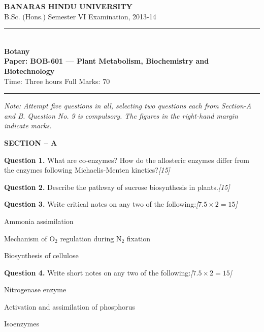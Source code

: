 \documentclass[11pt,a4paper]{article}
\newcommand{\pts}[1]{\hfill   \textit{[#1]}}
\begin{document}
\begin{center}
  {\large\bfseries BANARAS HINDU UNIVERSITY}\\[2pt]
  {\normalsize B.Sc. (Hons.) Semester VI Examination, 2013-14}\\[6pt]
  \rule{0.8\linewidth}{0.5pt}\\[6pt]
  {\large\bfseries Botany}\\[4pt]
  {\large\bfseries Paper: BOB-601 --- Plant Metabolism, Biochemistry and Biotechnology}\\[4pt]
  {\normalsize Time: Three hours \hfill Full Marks: 70}
\end{center}

\rule{\linewidth}{0.4pt}

\smallskip



\noindent   \textit{Note: Attempt five questions in all, selecting two questions each from Section-A and B. Question No. 9 is compulsory. The figures in the right-hand margin indicate marks.}

\bigskip


\begin{center}
   \textbf{SECTION -- A}
\end{center}

\medskip


\noindent   \textbf{Question 1.} What are co-enzymes? How do the allosteric enzymes differ from the enzymes following Michaelis-Menten kinetics?\pts{15}

\medskip


\noindent   \textbf{Question 2.} Describe the pathway of sucrose biosynthesis in plants.\pts{15}

\medskip


\noindent   \textbf{Question 3.} Write critical notes on any two of the following:\pts{$7.5  \times 2 = 15$}

\begin{parts}
  \item Ammonia assimilation
  \item Mechanism of $ \text{O}_2$ regulation during $ \text{N}_2$ fixation
  \item Biosynthesis of cellulose
\end{parts}

\medskip


\noindent   \textbf{Question 4.} Write short notes on any two of the following:\pts{$7.5  \times 2 = 15$}

\begin{parts}
  \item Nitrogenase enzyme
  \item Activation and assimilation of phosphorus
  \item Isoenzymes
\end{parts}
\end{document}
